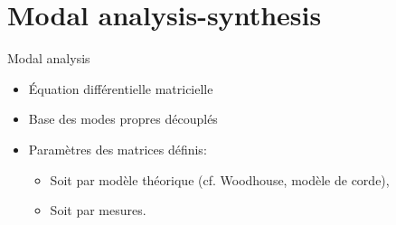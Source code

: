 \section{Modal analysis-synthesis}

\begin{frame}{Modal analysis}
 \begin{itemize}
  \item Équation différentielle matricielle
  \item Base des modes propres découplés
  \item Paramètres des matrices définis:
    \begin{itemize}
     \item Soit par modèle théorique (cf. Woodhouse, modèle de corde),
     \item Soit par mesures.
    \end{itemize}
 \end{itemize}
\end{frame}